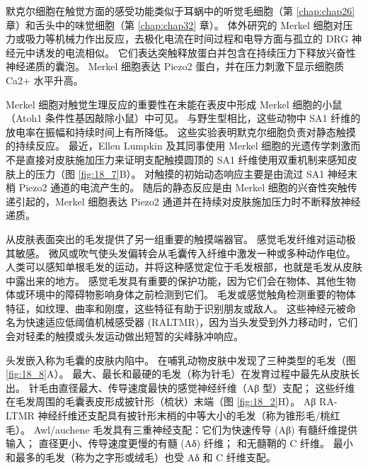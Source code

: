 默克尔细胞在触觉方面的感受功能类似于耳蜗中的听觉毛细胞（第 \ref{chap:chap26} 章）和舌头中的味觉细胞（第 \ref{chap:chap32} 章）。 
体外研究的 Merkel 细胞对压力或吸力等机械力作出反应，去极化电流在时间过程和电导方面与孤立的 DRG 神经元中诱发的电流相似。 
它们表达突触释放蛋白并包含在持续压力下释放兴奋性神经递质的囊泡。 
Merkel 细胞表达 Piezo2 蛋白，并在压力刺激下显示细胞质 Ca2+ 水平升高。


Merkel 细胞对触觉生理反应的重要性在未能在表皮中形成 Merkel 细胞的小鼠（Atoh1 条件性基因敲除小鼠）中可见。 
与野生型相比，这些动物中 SA1 纤维的放电率在振幅和持续时间上有所降低。 
这些实验表明默克尔细胞负责对静态触摸的持续反应。 
最近，Ellen Lumpkin 及其同事使用 Merkel 细胞的光遗传学刺激而不是直接对皮肤施加压力来证明支配触摸圆顶的 SA1 纤维使用双重机制来感知皮肤上的压力（图 \ref{fig:18_7}B）。 
对触摸的初始动态响应主要是由流过 SA1 神经末梢 Piezo2 通道的电流产生的。 
随后的静态反应是由 Merkel 细胞的兴奋性突触传递引起的，Merkel 细胞表达 Piezo2 通道并在持续对皮肤施加压力时不断释放神经递质。


从皮肤表面突出的毛发提供了另一组重要的触摸端器官。 
感觉毛发纤维对运动极其敏感。 
微风或吹气使头发偏转会从毛囊传入纤维中激发一种或多种动作电位。 
人类可以感知单根毛发的运动，并将这种感觉定位于毛发根部，也就是毛发从皮肤中露出来的地方。 
感觉毛发具有重要的保护功能，因为它们会在物体、其他生物体或环境中的障碍物影响身体之前检测到它们。 
毛发或感觉触角检测重要的物体特征，如纹理、曲率和刚度，这些特征有助于识别朋友或敌人。 
这些神经元被命名为快速适应低阈值机械感受器 (RALTMR)，因为当头发受到外力移动时，它们会对轻柔的触摸或头发运动做出短暂的尖峰脉冲响应。


头发嵌入称为毛囊的皮肤内陷中。 
在哺乳动物皮肤中发现了三种类型的毛发（图 \ref{fig:18_8}A）。 
最大、最长和最硬的毛发（称为针毛）在发育过程中最先从皮肤长出。 
针毛由直径最大、传导速度最快的感觉神经纤维（Aβ 型）支配； 这些纤维在毛发周围的毛囊表皮形成披针形（梳状）末端（图 \ref{fig:18_2}H）。 
Aβ RA-LTMR 神经纤维还支配具有披针形末梢的中等大小的毛发（称为锥形毛/桃红毛）。 
Awl/auchene 毛发具有三重神经支配：它们为快速传导 (Aβ) 有髓纤维提供输入； 直径更小、传导速度更慢的有髓 (Aδ) 纤维； 和无髓鞘的 C 纤维。 
最小和最多的毛发（称为之字形或绒毛）也受 Aδ 和 C 纤维支配。

